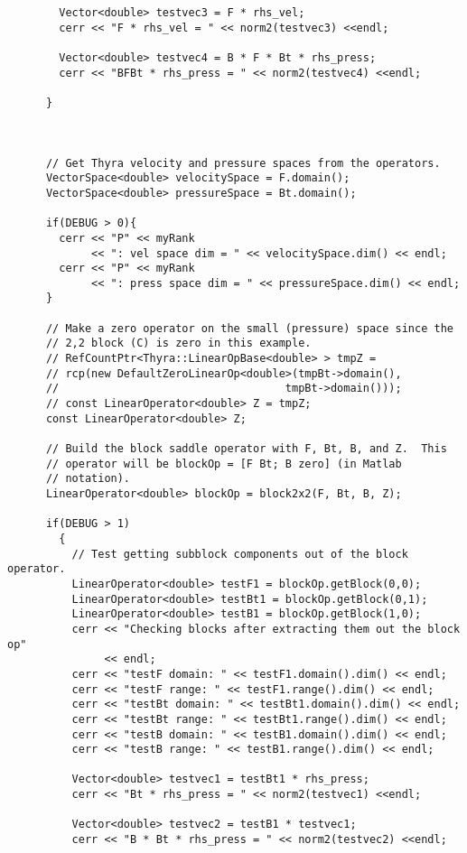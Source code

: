 \documentclass[oneeqnum,onefignum,onetabnum,10pt]{SANDreport}
\begin{document}
\begin{verbatim}
        Vector<double> testvec3 = F * rhs_vel;
        cerr << "F * rhs_vel = " << norm2(testvec3) <<endl;

        Vector<double> testvec4 = B * F * Bt * rhs_press;
        cerr << "BFBt * rhs_press = " << norm2(testvec4) <<endl;

      }



      // Get Thyra velocity and pressure spaces from the operators.
      VectorSpace<double> velocitySpace = F.domain();
      VectorSpace<double> pressureSpace = Bt.domain();

      if(DEBUG > 0){
        cerr << "P" << myRank 
             << ": vel space dim = " << velocitySpace.dim() << endl;
        cerr << "P" << myRank 
             << ": press space dim = " << pressureSpace.dim() << endl;
      }

      // Make a zero operator on the small (pressure) space since the
      // 2,2 block (C) is zero in this example.
      // RefCountPtr<Thyra::LinearOpBase<double> > tmpZ = 
      // rcp(new DefaultZeroLinearOp<double>(tmpBt->domain(), 
      //                                   tmpBt->domain()));
      // const LinearOperator<double> Z = tmpZ;
      const LinearOperator<double> Z;

      // Build the block saddle operator with F, Bt, B, and Z.  This
      // operator will be blockOp = [F Bt; B zero] (in Matlab
      // notation).
      LinearOperator<double> blockOp = block2x2(F, Bt, B, Z);

      if(DEBUG > 1) 
        {
          // Test getting subblock components out of the block operator.
          LinearOperator<double> testF1 = blockOp.getBlock(0,0);
          LinearOperator<double> testBt1 = blockOp.getBlock(0,1);
          LinearOperator<double> testB1 = blockOp.getBlock(1,0);
          cerr << "Checking blocks after extracting them out the block op"
               << endl;
          cerr << "testF domain: " << testF1.domain().dim() << endl;
          cerr << "testF range: " << testF1.range().dim() << endl;
          cerr << "testBt domain: " << testBt1.domain().dim() << endl;
          cerr << "testBt range: " << testBt1.range().dim() << endl;
          cerr << "testB domain: " << testB1.domain().dim() << endl;
          cerr << "testB range: " << testB1.range().dim() << endl;

          Vector<double> testvec1 = testBt1 * rhs_press;
          cerr << "Bt * rhs_press = " << norm2(testvec1) <<endl;
	  
          Vector<double> testvec2 = testB1 * testvec1;
          cerr << "B * Bt * rhs_press = " << norm2(testvec2) <<endl;
	  

\end{verbatim}
\end{document}
